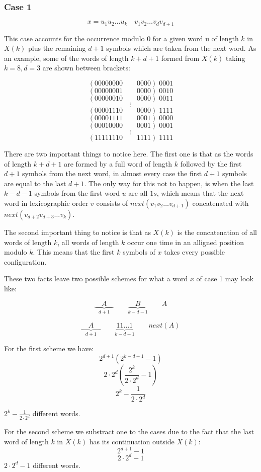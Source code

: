 \documentclass[11pt,a4paper,twoside]{tesis}
\theoremstyle{definition}
\begin{document}
\subsubsection{Case 1}
$$x = u_1 u_2 \dots u_k \quad v_1 v_2 \dots v_{d} v_{d + 1}$$

This case accounts for the occurrence modulo 0 for a given word u of length $k$ in $X(k)$ plus the remaining $d + 1$ symbols which are taken from the next word.
As an example, some of the words of length $k + d + 1$ formed from $X(k)$ taking $k = 8, d = 3$ are shown between brackets:

$$( 00000000 \qquad 0000 ) \; 0001$$
$$( 00000001 \qquad 0000 ) \; 0010$$
$$( 00000010 \qquad 0000 ) \; 0011$$
$$\vdots$$
$$( 00001110 \qquad 0000 ) \; 1111$$
$$( 00001111 \qquad 0001 ) \; 0000$$
$$( 00010000 \qquad 0001 ) \; 0001$$
$$\vdots$$
$$( 11111110 \qquad 1111 ) \; 1111$$

There are two important things to notice here. The first one is that as the words of length $k + d + 1$ are formed by a full word of length $k$ followed by the first $d + 1$ symbols from the next word, in almost every case the first $d + 1$ symbols are equal to the last $d + 1$.
The only way for this not to happen, is when the last $k - d - 1$ symbols from the first word $u$ are all $1s$, which means that the next word in lexicographic order $v$ consists of $next(v_1 v_2 \dots v_{d + 1})$ concatenated with $next(v_{d + 2} v_{d + 3} \dots v_{k})$.

The second important thing to notice is that as $X(k)$ is the concatenation of all words of length $k$, all words of length $k$ occur one time in an alligned position modulo $k$. This means that the first $k$ symbols of $x$ takes every possible configuration. 

These two facts leave two possible schemes for what a word $x$ of case 1 may look like:

$$\underbrace{\quad A \quad }_{d +1} \qquad \underbrace{\quad B \quad }_{k - d - 1}  \qquad A$$


$$\underbrace{\quad A \quad }_{d +1} \qquad \underbrace{ 11 \dots 1  }_{k - d - 1}  \qquad next(A) $$

For the first scheme we have:
$$2^{d + 1}  (2^{k - d - 1} - 1)$$
$$ 2\cdot2^{d}  (\frac{2^k}{2\cdot2^d} - 1)$$
$$ 2^k - \frac{1}{2\cdot2^{d} }$$

$ 2^k - \frac{1}{2\cdot2^{d} }$ different words.

For the second scheme we substract one to the cases due to the fact that the last word of length $k$ in $X(k)$ has its continuation outside $X(k)$:
$$2^{d + 1}   - 1$$
$$2\cdot 2^d - 1$$
$ 2\cdot 2^d - 1 $ different words.
\\
\end{document}
